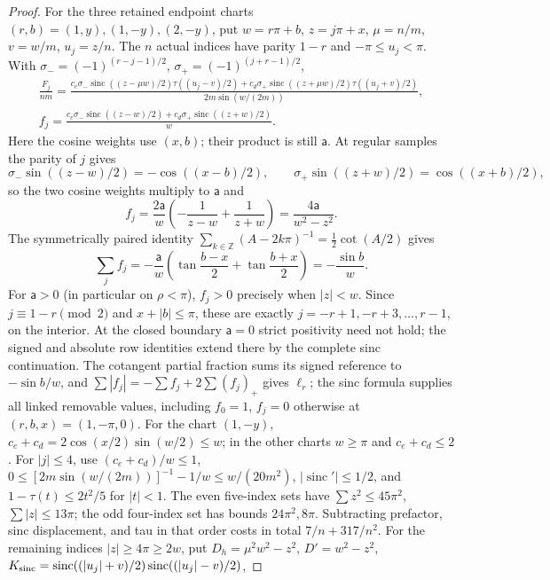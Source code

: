 \begin{proof}
For the three retained endpoint charts $(r,b)=(1,y),(1,-y),(2,-y)$,
put $w=r\pi+b$, $z=j\pi+x$, $\mu=n/m$, $v=w/m$, $u_j=z/n$.
The $n$ actual indices have parity $1-r$ and $-\pi\leq u_j<\pi$.
With $\sigma_-=(-1)^{(r-j-1)/2}$, $\sigma_+=(-1)^{(j+r-1)/2}$,
\begin{equation}\label{uc:sinc-row}
 \begin{aligned}
 \frac{F_j}{nm}=
 \frac{c_e\sigma_-\operatorname{sinc}((z-\mu w)/2)\tau((u_j-v)/2)
       +c_d\sigma_+\operatorname{sinc}((z+\mu w)/2)\tau((u_j+v)/2)}
 {2m\sin(w/(2m))},\\
 f_j=\frac{c_e\sigma_-\operatorname{sinc}((z-w)/2)
                  +c_d\sigma_+\operatorname{sinc}((z+w)/2)}w.
 \end{aligned}
\end{equation}
Here the cosine weights use $(x,b)$; their product is still $\mathsf{a}$.
At regular samples the parity of $j$ gives
\[
\sigma_-\sin((z-w)/2)=-\cos((x-b)/2),\qquad
\sigma_+\sin((z+w)/2)=\cos((x+b)/2),
\]
so the two cosine weights multiply to $\mathsf a$ and
\[
f_j=\frac{2\mathsf a}{w}\left(-\frac1{z-w}+\frac1{z+w}\right)
=\frac{4\mathsf a}{w^2-z^2}.
\]
The symmetrically paired identity
$\sum_{k\in\mathbb Z}(A-2k\pi)^{-1}=\frac12\cot(A/2)$ gives
\[
\sum_jf_j=-\frac{\mathsf a}{w}
\left(\tan\frac{b-x}{2}+\tan\frac{b+x}{2}\right)
=-\frac{\sin b}{w}.
\]
For $\mathsf a>0$ (in particular on $\rho<\pi$), $f_j>0$
precisely when $|z|<w$. Since $j\equiv1-r\pmod2$
and $x+|b|\leq\pi$, these are exactly
$j=-r+1,-r+3,\ldots,r-1$, on the interior. At the closed boundary $\mathsf a=0$ strict
positivity need not hold; the signed and absolute row identities
extend there by the complete sinc continuation. The cotangent
partial fraction sums its signed reference to $-\sin b/w$, and
$\sum|f_j|=-\sum f_j+2\sum(f_j)_+$ gives $\ell_r$;
the sinc formula supplies all linked removable values, including
$f_0=1$, $f_j=0$ otherwise at $(r,b,x)=(1,-\pi,0)$.
For the chart $(1,-y)$, $c_e+c_d=2\cos(x/2)\sin(w/2)\leq w$;
in the other charts $w\geq\pi$ and $c_e+c_d\leq2$.
For $|j|\leq4$, use $(c_e+c_d)/w\leq1$,
$0\leq[2m\sin(w/(2m))]^{-1}-1/w\leq w/(20m^2)$,
$|\operatorname{sinc}'|\leq1/2$, and $1-\tau(t)\leq2t^2/5$
for $|t|<1$. The even five-index sets have
$\sum z^2\leq45\pi^2$, $\sum|z|\leq13\pi$; the odd four-index
set has bounds $24\pi^2,8\pi$. Subtracting prefactor, sinc displacement,
and tau in that order costs in total $7/n+317/n^2$.
For the remaining indices $|z|\geq4\pi\geq2w$, put
$D_h=\mu^2w^2-z^2$, $D'=w^2-z^2$,
$K_{\rm sinc}=\operatorname{sinc}((|u_j|+v)/2)\operatorname{sinc}((|u_j|-v)/2)$,

\end{proof}
